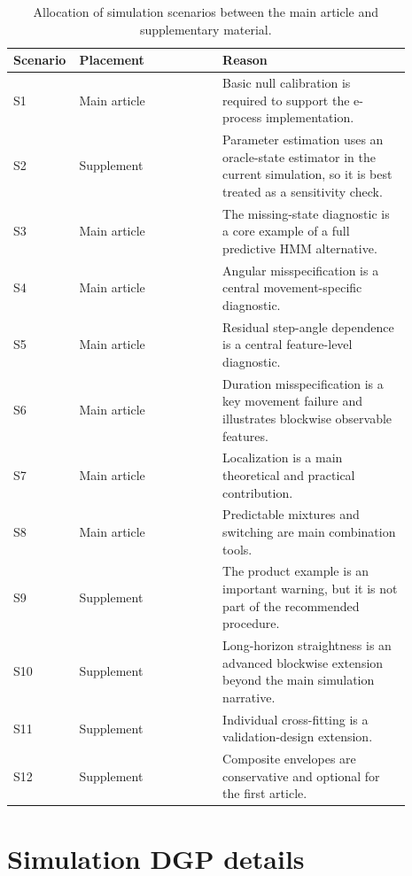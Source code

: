 \documentclass[pdflatex,sn-basic]{sn-jnl}
\newcommand{\1}{\mathbf 1}
\begin{document}
\begin{table}[h]
\centering
\footnotesize
\begin{tabular}{@{}>{\raggedright\arraybackslash}p{0.08\linewidth}>{\raggedright\arraybackslash}p{0.35\linewidth}>{\raggedright\arraybackslash}p{0.46\linewidth}@{}}
\toprule
Scenario & Placement & Reason \\
\midrule
S1 & Main article & Basic null calibration is required to support the e-process implementation. \\
S2 & Supplement & Parameter estimation uses an oracle-state estimator in the current simulation, so it is best treated as a sensitivity check. \\
S3 & Main article & The missing-state diagnostic is a core example of a full predictive HMM alternative. \\
S4 & Main article & Angular misspecification is a central movement-specific diagnostic. \\
S5 & Main article & Residual step-angle dependence is a central feature-level diagnostic. \\
S6 & Main article & Duration misspecification is a key movement failure and illustrates blockwise observable features. \\
S7 & Main article & Localization is a main theoretical and practical contribution. \\
S8 & Main article & Predictable mixtures and switching are main combination tools. \\
S9 & Supplement & The product example is an important warning, but it is not part of the recommended procedure. \\
S10 & Supplement & Long-horizon straightness is an advanced blockwise extension beyond the main simulation narrative. \\
S11 & Supplement & Individual cross-fitting is a validation-design extension. \\
S12 & Supplement & Composite envelopes are conservative and optional for the first article. \\
\bottomrule
\end{tabular}
\caption{Allocation of simulation scenarios between the main article and supplementary material.}
\label{tab:supp_allocation}
\end{table}

\section{Simulation DGP details}
\label{sec:dgp_details}
\end{document}

